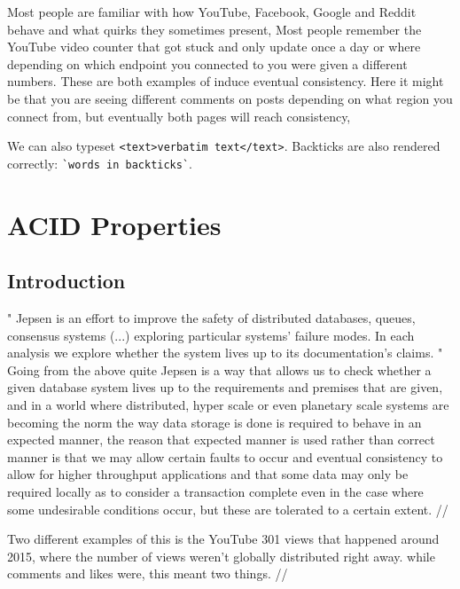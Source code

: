\documentclass[a4paper,10pt,titlepage]{report}
\begin{document}
Most people are familiar with how YouTube, Facebook, Google and Reddit behave and what quirks they sometimes present, Most people remember the YouTube video counter that got stuck and only update once a day or where depending on which endpoint you connected to you were given a different numbers. These are both examples of induce eventual consistency. Here it might be that you are seeing different comments on posts depending on what region you connect from, but eventually both pages will reach consistency, 

We can also typeset \verb|<text>verbatim text</text>|.
Backticks are also rendered correctly: \verb|`words in backticks`|.





\section{ACID Properties}








\subsection{Introduction}
"
Jepsen is an effort to improve the safety of distributed databases, queues, consensus systems  (...) exploring particular systems’ failure modes. In each analysis we explore whether the system lives up to its documentation’s claims.
"\cite{jepsonio}
\\

Going from the above quite Jepsen is a way that allows us to check whether a given database system lives up to the requirements and premises that are given, and in a world where distributed, hyper scale or even planetary scale systems are becoming the norm the way data storage is done is required to behave in an expected manner, the reason that expected manner is used rather than correct manner is that we may allow certain faults to occur and eventual consistency to allow for higher throughput applications and that some data may only be required locally as to consider a transaction complete even in the case where some undesirable conditions occur, but these are tolerated to a certain extent. //

Two different examples of this is the YouTube 301 views that happened around 2015, where the number of views weren't globally distributed right away. while comments and likes were, this meant two things. //
\end{document}
